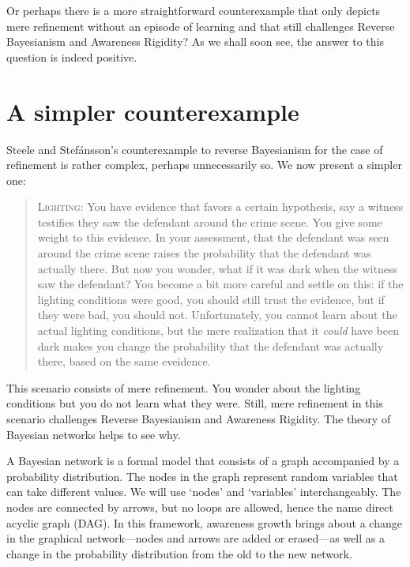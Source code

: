 \documentclass[
  11pt,
  dvipsnames,enabledeprecatedfontcommands]{scrartcl}
\begin{document}
Or perhaps there is a more straightforward counterexample that only
depicts mere refinement without an episode of learning and that still
challenges Reverse Bayesianism and Awareness Rigidity? As we shall soon
see, the answer to this question is indeed positive.

\hypertarget{a-simpler-counterexample}{%
\section{A simpler counterexample}\label{a-simpler-counterexample}}

Steele and Stefánsson's counterexample to reverse Bayesianism for the
case of refinement is rather complex, perhaps unnecessarily so. We now
present a simpler one:

\begin{quote}
\textsc{Lighting:} You have evidence that favors a certain hypothesis,
say a witness testifies they saw the defendant around the crime scene.
You give some weight to this evidence. In your assessment, that the
defendant was seen around the crime scene raises the probability that
the defendant was actually there. But now you wonder, what if it was
dark when the witness saw the defendant? You become a bit more careful
and settle on this: if the lighting conditions were good, you should
still trust the evidence, but if they were bad, you should not.
Unfortunately, you cannot learn about the actual lighting conditions,
but the mere realization that it \textit{could} have been dark makes you
change the probability that the defendant was actually there, based on
the same eveidence.
\end{quote}

\noindent This scenario consists of mere refinement. You wonder about
the lighting conditions but you do not learn what they were. Still, mere
refinement in this scenario challenges Reverse Bayesianism and Awareness
Rigidity. The theory of Bayesian networks helps to see why.

A Bayesian network is a formal model that consists of a graph
accompanied by a probability distribution. The nodes in the graph
represent random variables that can take different values. We will use
`nodes' and `variables' interchangeably. The nodes are connected by
arrows, but no loops are allowed, hence the name direct acyclic graph
(DAG). In this framework, awareness growth brings about a change in the
graphical network---nodes and arrows are added or erased---as well as a
change in the probability distribution from the old to the new network.
\end{document}
